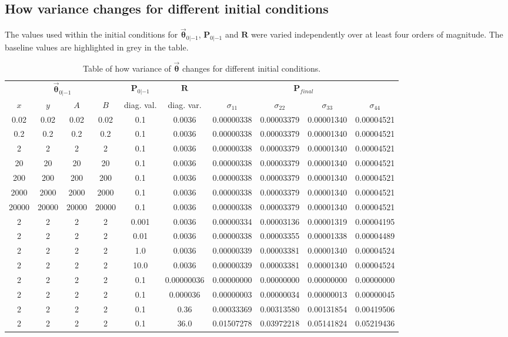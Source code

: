 \documentclass[a4paper]{article}
\begin{document}
	\subsection{How variance changes for different initial conditions}\label{How_variance_changes_for_different_initial_conditions}
	The values used within the initial conditions for $\bm{\vec{\theta}}_{0|-1}$, $\bm{P}_{0|-1}$ and $\bm{R}$ were varied independently over at least four orders of magnitude. The baseline values are highlighted in grey in the table.
	\begin{table}[h!]
		\centering
		\begin{tabular}{| c c c c | c | c | c c c c |}
			\hline
			\multicolumn{4}{|c|}{$\bm{\vec{\theta}}_{0|-1}$} & $\bm{P}_{0|-1}$ & $\bm{R}$ & \multicolumn{4}{|c|}{$\bm{P}_{final}$} \\
			$x$ & $y$ & $A$ & $B$ & diag. val. & diag. var. & $\sigma_{11}$ & $\sigma_{22}$ & $\sigma_{33}$ & $\sigma_{44}$ \\
			\hline
			0.02 &	0.02 &	0.02 &	0.02 &	0.1 &	0.0036 &	0.00000338 &	0.00003379 &	0.00001340 &	0.00004521 \\
			0.2 & 	0.2 &	0.2 & 		0.2 &		0.1 &	0.0036 &	0.00000338 &	0.00003379 &	0.00001340 &	0.00004521 \\
			\rowcolor{gray!30} 2 &		2 &			2 &			2 &			0.1 &	0.0036 &	0.00000338 &	0.00003379 &	0.00001340 &	0.00004521 \\
			20 &	20 &	20 &		20 &		0.1 &	0.0036 &	0.00000338 &	0.00003379 &	0.00001340 &	0.00004521 \\
			200 &	200 &	200 &	200 &	0.1 &	0.0036 &	0.00000338 &	0.00003379 &	0.00001340 &	0.00004521 \\
			2000 &	2000 &	2000 &	2000 &	0.1 &	0.0036 &	0.00000338 &	0.00003379 &	0.00001340 &	0.00004521 \\
			20000 &	20000 &	20000 &	20000 &	0.1 &	0.0036 &	0.00000338 &	0.00003379 &	0.00001340 &	0.00004521 \\
			\hline
			2 &		2 &			2 &			2 &			0.001 &	0.0036 &	0.00000334 &	0.00003136 &	0.00001319 &	0.00004195 \\
			2 &		2 &			2 &			2 &			0.01 &	0.0036 &	0.00000338 &	0.00003355 &	0.00001338 &	0.00004489 \\
			2 &		2 &			2 &			2 &			1.0 &	0.0036 &	0.00000339 &	0.00003381 &	0.00001340 &	0.00004524 \\
			2 &		2 &			2 &			2 &			10.0 &	0.0036 &	0.00000339 &	0.00003381 &	0.00001340 &	0.00004524 \\
			\hline
			2 &		2 &			2 &			2 &			0.1 &	0.00000036 &	0.00000000 &	0.00000000 &	0.00000000 &	0.00000000 \\
			2 &		2 &			2 &			2 &			0.1 &	0.000036 &		0.00000003 &	0.00000034 &	0.00000013 &	0.00000045 \\
			2 &		2 &			2 &			2 &			0.1 &	0.36 &				0.00033369 &	0.00313580 &	0.00131854 &	0.00419506 \\
			2 &		2 &			2 &			2 &			0.1 &	36.0 &				0.01507278 &	0.03972218 &	0.05141824 &	0.05219436 \\
			\hline  
		\end{tabular}
		\caption{Table of how variance of $\bm{\vec{\theta}}$ changes for different initial conditions.}\label{Tab_var_changes}
	\end{table}
\end{document}
